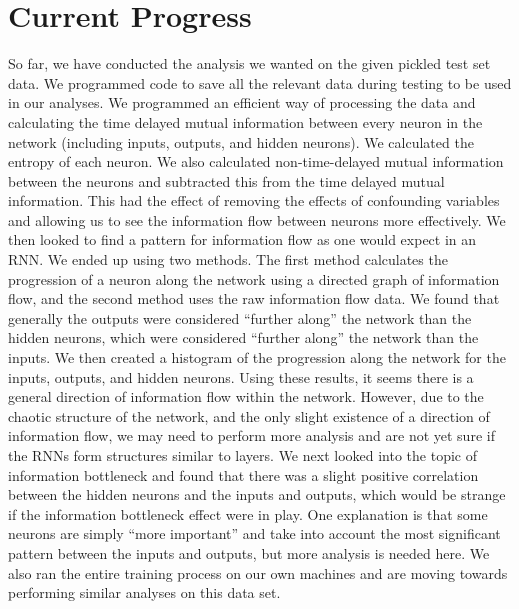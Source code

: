 \section{Current Progress}
So far, we have conducted the analysis we wanted on the given pickled test set
data. We programmed code to save all the relevant data during testing to be used
in our analyses. We programmed an efficient way of processing the data and
calculating the time delayed mutual information between every neuron in the
network (including inputs, outputs, and hidden neurons). We calculated the
entropy of each neuron.
We also calculated non-time-delayed mutual information between the neurons and
subtracted this from the time delayed mutual information. This had the effect of
removing the effects of confounding variables and allowing us to see the
information flow between neurons more effectively.
We then looked to find a pattern for information flow as one would expect in an
RNN. We ended up using two methods. The first method calculates the progression
of a neuron along the network using a directed graph of information flow, and
the second method uses the raw information flow data. We found that generally
the outputs were considered “further along” the network than the hidden neurons,
which were considered “further along” the network than the inputs. We then
created a histogram of the progression along the network for the inputs,
outputs, and hidden neurons. Using these results, it seems there is a general
direction of information flow within the network. However, due to the chaotic
structure of the network, and the only slight existence of a direction of
information flow, we may need to perform more analysis and are not yet sure if
the RNNs form structures similar to layers.
We next looked into the topic of information bottleneck and found that there was
a slight positive correlation between the hidden neurons and the inputs and
outputs, which would be strange if the information bottleneck effect were in
play. One explanation is that some neurons are simply “more important” and take
into account the most significant pattern between the inputs and outputs, but
more analysis is needed here.
We also ran the entire training process on our own machines and are moving
towards performing similar analyses on this data set.


